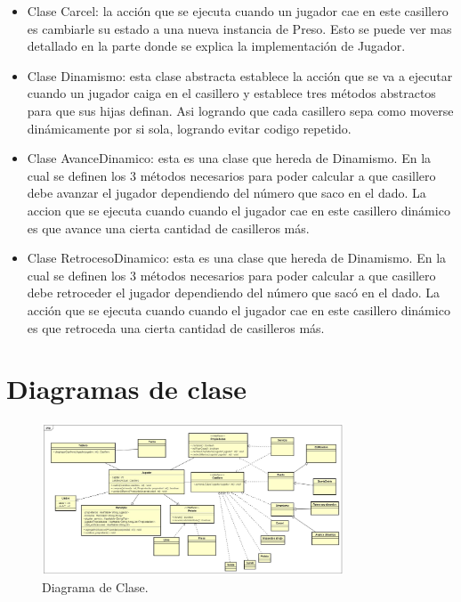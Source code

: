 \documentclass[titlepage,a4paper]{article}
\begin{document}
\begin{itemize}
\item 
Clase Carcel: la acción que se ejecuta cuando un jugador cae en este casillero es cambiarle su estado a una nueva instancia de Preso. Esto se puede ver mas detallado en la parte donde se explica la implementación de Jugador.
\end{itemize}
\begin{itemize}
\item 
Clase Dinamismo: esta clase abstracta establece la acción que se va a ejecutar cuando un jugador caiga en el casillero y establece tres métodos abstractos para que sus hijas definan. Asi logrando  que cada casillero sepa como moverse dinámicamente por si sola, logrando evitar codigo repetido. 
\end{itemize}
\begin{itemize}
\item 
Clase AvanceDinamico: esta es una clase que hereda de Dinamismo. En la cual se definen los 3 métodos necesarios para poder calcular a que casillero debe avanzar el jugador dependiendo del número que saco en el dado. La accion que se ejecuta cuando cuando el jugador cae en este casillero dinámico es que avance una cierta cantidad de casilleros más. 
\end{itemize}
\begin{itemize}
\item 
Clase RetrocesoDinamico: esta es una clase que hereda de Dinamismo. En la cual se definen los 3 métodos necesarios para poder calcular a que casillero debe retroceder el jugador dependiendo del número que sacó en el dado. La acción que se ejecuta cuando cuando el jugador cae en este casillero dinámico es que retroceda una cierta cantidad de casilleros más. 
\end{itemize}




\section{Diagramas de clase}\label{sec:diagramasdeclase}

\begin{figure}[H]
\centering
\includegraphics[width=0.8\textwidth]{Class_Diagram0Algopoly2.jpg}
\caption{\label{fig:class01}Diagrama de Clase.}
\end{figure}
\end{document}
